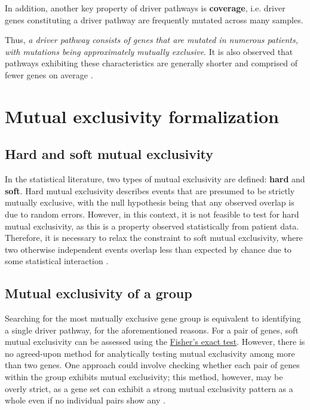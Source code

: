 In addition, another key property of driver pathways is \textbf{coverage}, i.e. driver genes constituting a driver pathway are frequently mutated across many samples. 

Thus, \textit{a driver pathway consists of genes that are mutated in numerous patients, with mutations being approximately mutually exclusive}. It is also observed that pathways exhibiting these characteristics are generally shorter and comprised of fewer genes on average \cite{multi-dendrix}.

\section{Mutual exclusivity formalization}

\subsection{Hard and soft mutual exclusivity}

In the statistical literature, two types of mutual exclusivity are defined: \textbf{hard} and \textbf{soft}. Hard mutual exclusivity describes events that are presumed to be strictly mutually exclusive, with the null hypothesis being that any observed overlap is due to random errors. However, in this context, it is not feasible to test for hard mutual exclusivity, as this is a property observed statistically from patient data. Therefore, it is necessary to relax the constraint to soft mutual exclusivity, where two otherwise independent events overlap less than expected by chance due to some statistical interaction \cite{mutex}.

\subsection{Mutual exclusivity of a group}

Searching for the most mutually exclusive gene group is equivalent to identifying a single driver pathway, for the aforementioned reasons. For a pair of genes, soft mutual exclusivity can be assessed using the \href{https://en.wikipedia.org/wiki/Fisher\%27s_exact_test}{Fisher's exact test}. However, there is no agreed-upon method for analytically testing mutual exclusivity among more than two genes. One approach could involve checking whether each pair of genes within the group exhibits mutual exclusivity; this method, however, may be overly strict, as a gene set can exhibit a strong mutual exclusivity pattern as a whole even if no individual pairs show any \cite{mutex}.

